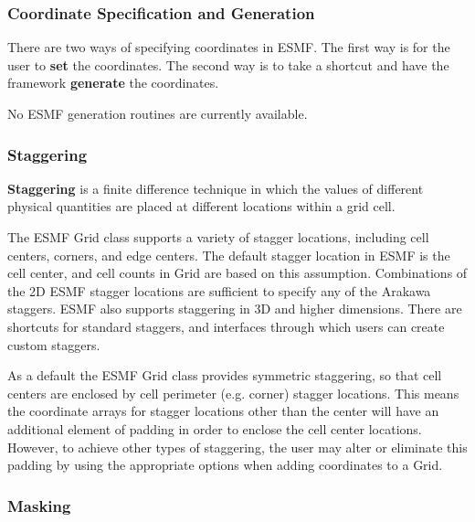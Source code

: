 \subsubsection{Coordinate Specification and Generation}

There are two ways of specifying coordinates in ESMF.  The
first way is for the user to {\bf set} the coordinates.  The second 
way is to take a shortcut and have the framework {\bf generate}
the coordinates.  

No ESMF generation routines are currently available.


\subsubsection{Staggering}

{\bf Staggering} is a finite difference technique in which the values 
of different physical quantities are placed at different locations
within a grid cell. 

The ESMF Grid class supports a variety of stagger locations, including
cell centers, corners, and edge centers. The default stagger location in 
ESMF is the cell center, and cell counts in Grid are based on this assumption.
Combinations of the 2D ESMF stagger locations are sufficient to specify any of the
Arakawa staggers.  ESMF also supports staggering in 3D and higher dimensions.
There are shortcuts for standard staggers, and interfaces through which users 
can create custom staggers.  

As a default the ESMF Grid class provides symmetric staggering, so
that cell centers are enclosed by cell perimeter (e.g. corner) 
stagger locations. This means the coordinate arrays for stagger
locations other than the center will have an additional element of 
padding in order to enclose the cell center locations.
However, to achieve other types of staggering, the user may alter 
or eliminate this padding by using the appropriate options when adding
coordinates to a Grid. 
 

\subsubsection{Masking}

